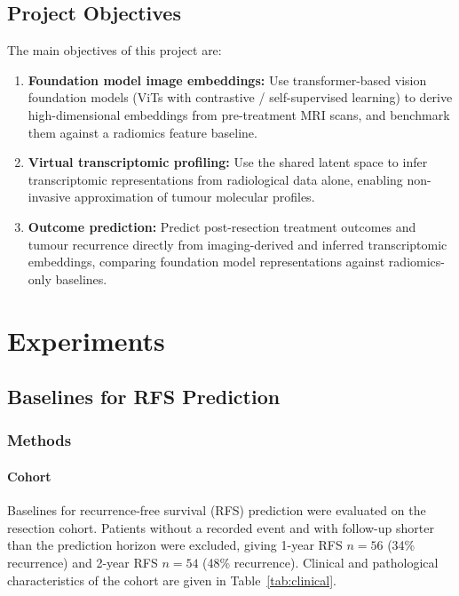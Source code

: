 \documentclass[12pt,twoside]{report}
\begin{document}
\section{Project Objectives}

The main objectives of this project are:
\begin{enumerate}
    \item \textbf{Foundation model image embeddings:} Use transformer-based vision foundation models
    (ViTs with contrastive / self-supervised learning) to derive high-dimensional embeddings from
    pre-treatment MRI scans, and benchmark them against a radiomics feature baseline.

    \item \textbf{Virtual transcriptomic profiling:} Use the shared latent space to infer
    transcriptomic representations from radiological data alone, enabling non-invasive approximation
    of tumour molecular profiles.

    \item \textbf{Outcome prediction:} Predict post-resection treatment outcomes and tumour recurrence
    directly from imaging-derived and inferred transcriptomic embeddings, comparing foundation model
    representations against radiomics-only baselines.
\end{enumerate}

\chapter{Experiments}

\section{Baselines for RFS Prediction}

\subsection*{Methods}

\subsubsection*{Cohort}

Baselines for recurrence-free survival (RFS) prediction were evaluated on the resection cohort.
Patients without a recorded event and with follow-up shorter than the prediction horizon were excluded,
giving 1-year RFS $n=56$ (34\% recurrence) and 2-year RFS $n=54$ (48\% recurrence). Clinical and pathological characteristics of the cohort are given in Table~\ref{tab:clinical}.
\end{document}
